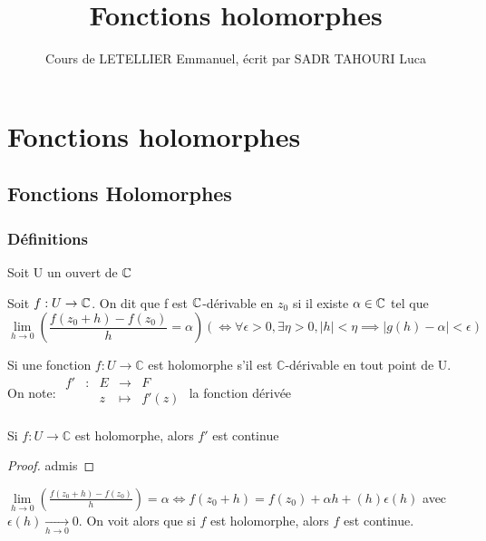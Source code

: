 \documentclass[]{report}
\title{Fonctions holomorphes}
\author{Cours de LETELLIER Emmanuel, écrit par SADR TAHOURI Luca}
\date{}
\begin{document}
    \maketitle
    \tableofcontents

    \chapter{Fonctions holomorphes}

\section{Fonctions Holomorphes}

\subsection{Définitions}

Soit U un ouvert de $\mathbb{C}$\\

\begin{df}{}{}
    Soit $f:U \to \mathbb{C}$. On dit que f est $\mathbb{C}$-dérivable en $z_0$ si il existe $\alpha \in \mathbb{C}$ tel que
\[\lim\limits_{h \to 0} \left(\frac{f(z_0+h)-f(z_0)}{h}=\alpha\right) (\iff \forall \epsilon >0, \exists\eta>0,|h|<\eta \implies|g(h)-\alpha|<\epsilon)\]
\end{df}

\begin{df}{}{}
    Si une fonction $f:U \to \mathbb{C}$ est holomorphe s'il est $\mathbb{C}$-dérivable en tout point de U. On note:
$\begin{array}{ccccc}
f' & : & E & \to & F \\
 & & z & \mapsto & f'(z) \\
\end{array}$ la fonction dérivée
\end{df}

\begin{tm}{}{}
    Si $f:U \to \mathbb{C}$ est holomorphe, alors $f'$ est continue
\end{tm}

\begin{proof}
    admis
\end{proof}

\begin{re}{}{}
    $\lim\limits_{h \to 0} \left(\frac{f(z_0+h)-f(z_0)}{h}\right)=\alpha \iff f(z_0+h)=f(z_0)+\alpha h +(h)\epsilon (h)$ avec $\epsilon(h)\underset{h\to 0}{\longrightarrow} 0$. On voit alors que si $f$ est holomorphe, alors $f$ est continue.
\end{re}
\end{document}
